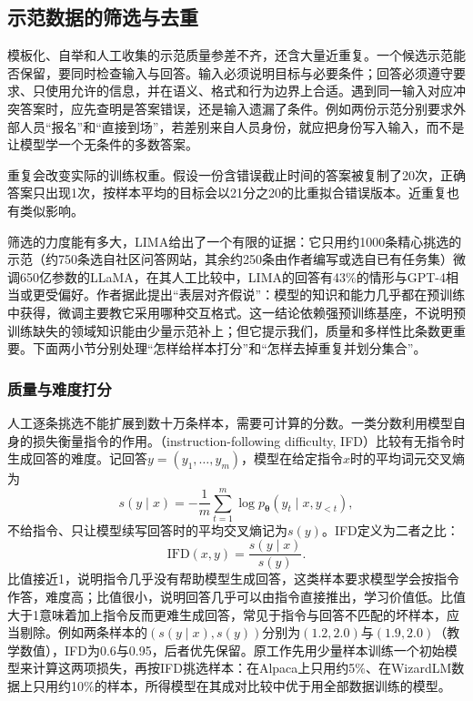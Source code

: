 \subsection{示范数据的筛选与去重}
\label{sec:nlp-sft-filtering}

模板化、自举和人工收集的示范质量参差不齐，还含大量近重复。一个候选示范能否保留，要同时检查输入与回答。输入必须说明目标与必要条件；回答必须遵守要求、只使用允许的信息，并在语义、格式和行为边界上合适。遇到同一输入对应冲突答案时，应先查明是答案错误，还是输入遗漏了条件。例如两份示范分别要求外部人员“报名”和“直接到场”，若差别来自人员身份，就应把身份写入输入，而不是让模型学一个无条件的多数答案。

重复会改变实际的训练权重。假设一份含错误截止时间的答案被复制了20次，正确答案只出现1次，按样本平均的目标会以21分之20的比重拟合错误版本。近重复也有类似影响。

筛选的力度能有多大，LIMA给出了一个有限的证据：它只用约1000条精心挑选的示范（约750条选自社区问答网站，其余约250条由作者编写或选自已有任务集）微调650亿参数的LLaMA，在其人工比较中，LIMA的回答有43\%的情形与GPT-4相当或更受偏好。作者据此提出“表层对齐假说”：模型的知识和能力几乎都在预训练中获得，微调主要教它采用哪种交互格式。这一结论依赖强预训练基座，不说明预训练缺失的领域知识能由少量示范补上；但它提示我们，质量和多样性比条数更重要。下面两小节分别处理“怎样给样本打分”和“怎样去掉重复并划分集合”。

\subsubsection{质量与难度打分}
\label{sec:nlp-sft-data-scoring}

人工逐条挑选不能扩展到数十万条样本，需要可计算的分数。一类分数利用模型自身的损失衡量指令的作用。（instruction-following difficulty, IFD）比较有无指令时生成回答的难度。记回答$y=(y_1,\ldots,y_m)$，模型在给定指令$x$时的平均词元交叉熵为
\[
 s(y\mid x)=-\frac1m\sum_{t=1}^{m}\log p_{\bm\theta}(y_t\mid x,y_{<t}),
\]
不给指令、只让模型续写回答时的平均交叉熵记为$s(y)$。IFD定义为二者之比：
\begin{equation}
 \mathrm{IFD}(x,y)=\frac{s(y\mid x)}{s(y)}.
 \label{eq:nlp-sft-ifd}
\end{equation}
比值接近1，说明指令几乎没有帮助模型生成回答，这类样本要求模型学会按指令作答，难度高；比值很小，说明回答几乎可以由指令直接推出，学习价值低。比值大于1意味着加上指令反而更难生成回答，常见于指令与回答不匹配的坏样本，应当剔除。例如两条样本的$(s(y\mid x),s(y))$分别为$(1.2,2.0)$与$(1.9,2.0)$（教学数值），IFD为0.6与0.95，后者优先保留。原工作先用少量样本训练一个初始模型来计算这两项损失，再按IFD挑选样本：在Alpaca上只用约5\%、在WizardLM数据上只用约10\%的样本，所得模型在其成对比较中优于用全部数据训练的模型。

